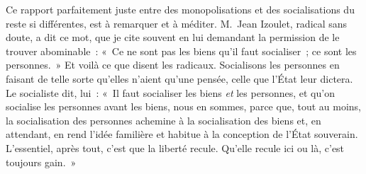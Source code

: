 \documentclass[french,twoside]{book} %
\begin{document}
Ce rapport parfaitement juste entre des monopolisations et des socialisations du reste si différentes, est à remarquer et à méditer. M. Jean  Izoulet, radical sans doute, a dit ce mot, que je cite souvent en lui demandant la permission de le trouver abominable : « Ce ne sont pas les biens qu’il faut socialiser ; ce sont les personnes. » Et voilà ce que disent les radicaux. Socialisons les personnes en faisant de telle sorte qu’elles n’aient qu’une pensée, celle que l’État leur dictera. Le socialiste dit, lui : « Il faut socialiser les biens {\itshape et} les personnes, et qu’on socialise les personnes avant les biens, nous en sommes, parce que, tout au moins, la socialisation des personnes achemine à la socialisation des biens et, en attendant, en rend l’idée familière et habitue à la conception de l’État souverain. L’essentiel, après tout, c’est que la liberté recule. Qu’elle recule ici ou là, c’est toujours gain. »\par
\end{document}

